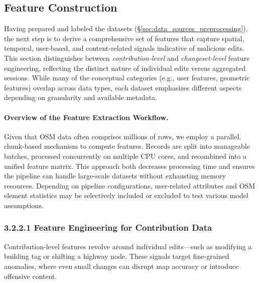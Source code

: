 \documentclass[
    13pt, %
    a4paper, %
    listof=totoc, %
    bibliography=totoc, %
    index=totoc, %
    headsepline
]{scrreprt}
\begin{document}
\subsection{Feature Construction}
\label{sec:feature_construction}

Having prepared and labeled the datasets (\S\ref{sec:data_sources_preprocessing}), the next step is to derive a comprehensive set of features that capture spatial, temporal, user-based, and content-related signals indicative of malicious edits. This section distinguishes between \emph{contribution-level} and \emph{changeset-level} feature engineering, reflecting the distinct nature of individual edits versus aggregated sessions. While many of the conceptual categories (e.g., user features, geometric features) overlap across data types, each dataset emphasizes different aspects depending on granularity and available metadata.

\paragraph{Overview of the Feature Extraction Workflow.}
Given that OSM data often comprises millions of rows, we employ a parallel, chunk-based mechanism to compute features. Records are split into manageable batches, processed concurrently on multiple CPU cores, and recombined into a unified feature matrix. This approach both decreases processing time and ensures the pipeline can handle large-scale datasets without exhausting memory resources. Depending on pipeline configurations, user-related attributes and OSM element statistics may be selectively included or excluded to test various model assumptions.


\subsubsection{3.2.2.1 Feature Engineering for Contribution Data}
\label{sec:feature_contribution}

Contribution-level features revolve around individual edits—such as modifying a building tag or shifting a highway node. These signals target fine-grained anomalies, where even small changes can disrupt map accuracy or introduce offensive content.
\end{document}
